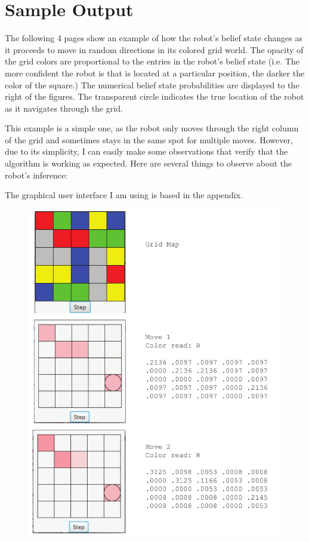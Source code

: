 \documentclass{article}
\begin{document}
\section{Sample Output}

The following 4 pages show an example of how the robot's belief state changes as it proceeds to move in random directions in its colored grid world. The opacity of the grid colors are proportional to the entries in the robot's belief state (i.e. The more confident the robot is that is located at a particular position, the darker the color of the square.) The numerical belief state probabilities are displayed to the right of the figures. The transparent circle indicates the true location of the robot as it navigates through the grid.

This example is a simple one, as the robot only moves through the right column of the grid and sometimes stays in the same spot for multiple moves. However, due to its simplicity, I can easily make some observations that verify that the algorithm is working as expected. Here are several things to observe about the robot's inference:






The graphical user interface I am using is based in the appendix.

\begin{figure}[H]
\centering
\includegraphics[scale=0.8]{example1.pdf}
\end{figure}
\end{document}
